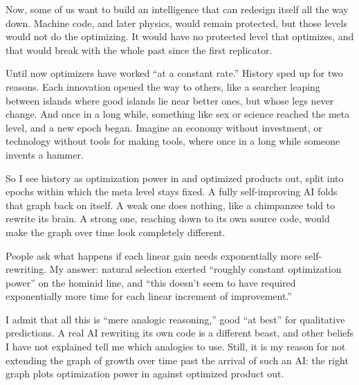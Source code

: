 Now, some of us want to build an intelligence that can redesign itself all the way down. Machine code, and later physics, would remain protected, but those levels would not do the optimizing. It would have no protected level that optimizes, and that would break with the whole past since the first replicator. 

Until now optimizers have worked ``at a constant rate.'' History sped up for two reasons. Each innovation opened the way to others, like a searcher leaping between islands where good islands lie near better ones, but whose legs never change. And once in a long while, something like sex or science reached the meta level, and a new epoch began. Imagine an economy without investment, or technology without tools for making tools, where once in a long while someone invents a hammer.

So I see history as optimization power in and optimized products out, split into epochs within which the meta level stays fixed. A fully self-improving AI folds that graph back on itself. A weak one does nothing, like a chimpanzee told to rewrite its brain. A strong one, reaching down to its own source code, would make the graph over time look completely different. 

People ask what happens if each linear gain needs exponentially more self-rewriting. My answer: natural selection exerted ``roughly constant optimization power'' on the hominid line, and ``this doesn't seem to have required exponentially more time for each linear increment of improvement.'' 

I admit that all this is ``mere analogic reasoning,'' good ``at best'' for qualitative predictions. A real AI rewriting its own code is a different beast, and other beliefs I have not explained tell me which analogies to use. Still, it is my reason for not extending the graph of growth over time past the arrival of such an AI: the right graph plots optimization power in against optimized product out. 
